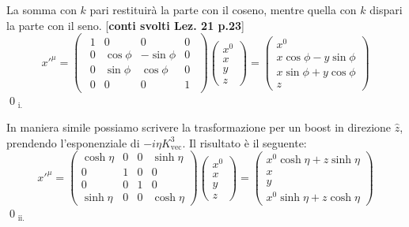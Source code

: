 \documentclass[../main.tex]{subfiles}
\begin{document}
\begin{exercise}
{        La somma con $k$ pari restituirà la parte con il coseno, mentre quella con $k$ dispari la parte con il seno. [\textbf{conti svolti Lez. 21 p.23}]
        }
        \[
        x'^\mu = 
        \begin{pmatrix}
            \begin{array}{c|ccc}
                 1   &   0   &   0   &   0\\
                \hline
                0   &   \cos\phi   &   -\sin\phi   &   0\\
                0   &   \sin\phi   &   \cos\phi   &   0\\
                0   &   0   &   0   &   1
            \end{array}
        \end{pmatrix}
        \begin{pmatrix}
            x^0 \\
            x \\
            y \\
            z
        \end{pmatrix}
        =
        \begin{pmatrix}
            x^0 \\
            x\cos\phi - y\sin\phi \\
            x\sin\phi + y\cos\phi \\
            z
        \end{pmatrix}
        \] \qed$_\text{i.}$

    In maniera simile possiamo scrivere la trasformazione per un boost in direzione $\hat z$, prendendo l'esponenziale di $-i\eta K^3_\text{vec}$. Il risultato è il seguente:
    \[
        x'^\mu = 
        \begin{pmatrix}
            \cosh\eta   &   0   &   0   &   \sinh\eta\\
            0   &   1   &   0   &   0\\
            0   &   0   &   1   &   0\\
            \sinh\eta   &   0   &   0   &   \cosh\eta
        \end{pmatrix}
        \begin{pmatrix}
            x^0 \\
            x \\
            y \\
            z
        \end{pmatrix}
        =
        \begin{pmatrix}
            x^0\cosh\eta + z\sinh\eta \\
            x \\
            y \\
            x^0\sinh\eta + z\cosh\eta
        \end{pmatrix}
        \] \qed$_\text{ii.}$
    \label{ex:explicit_rotation_boost_transform}
\end{exercise}
\end{document}
